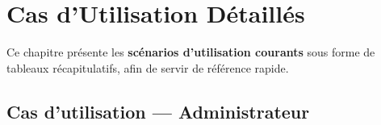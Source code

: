 \documentclass[12pt, a4paper, twoside, openright]{report}
\begin{document}
\chapter{Cas d'Utilisation Détaillés}
\label{chap:cas_utilisation}

Ce chapitre présente les \textbf{scénarios d'utilisation courants} sous forme de tableaux récapitulatifs, afin de servir de référence rapide.

\section{Cas d'utilisation — Administrateur}
\end{document}
